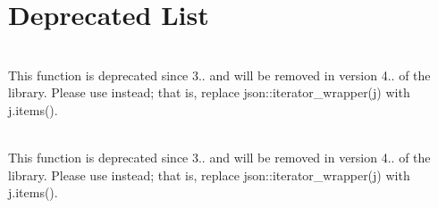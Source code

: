 \chapter{Deprecated List }
\hypertarget{deprecated}{}\label{deprecated}

\begin{DoxyRefList}
\item[{\parbox[t]{\linewidth}{Member \doxylink{classbasic__json_ab8b4e0acdea49e5f0a77abdf1ce465d2}{basic\+\_\+json\texorpdfstring{$<$}{<} Object\+Type, Array\+Type, String\+Type, Boolean\+Type, Number\+Integer\+Type, Number\+Unsigned\+Type, Number\+Float\+Type, Allocator\+Type, JSONSerializer, Binary\+Type, Custom\+Base\+Class \texorpdfstring{$>$}{>}::\+iterator\+\_\+wrapper} (reference ref) noexcept}}]\hfill \\
\label{deprecated__deprecated000148}%
%
This function is deprecated since 3.. and will be removed in version 4.. of the library. Please use  instead; that is, replace {\ttfamily json::\+iterator\+\_\+wrapper(j)} with {\ttfamily j.\+items()}.  
\item[{\parbox[t]{\linewidth}{Member \doxylink{classbasic__json_a7c0314258e5347eade0c6851017bf5a5}{basic\+\_\+json\texorpdfstring{$<$}{<} Object\+Type, Array\+Type, String\+Type, Boolean\+Type, Number\+Integer\+Type, Number\+Unsigned\+Type, Number\+Float\+Type, Allocator\+Type, JSONSerializer, Binary\+Type, Custom\+Base\+Class \texorpdfstring{$>$}{>}::\+iterator\+\_\+wrapper} (\doxylink{classbasic__json_a31370bb451b78198d42c86dd31955deb}{const\+\_\+reference} ref) noexcept}}]\hfill \\
\label{deprecated__deprecated000149}%
%
This function is deprecated since 3.. and will be removed in version 4.. of the library. Please use  instead; that is, replace {\ttfamily json::\+iterator\+\_\+wrapper(j)} with {\ttfamily j.\+items()}.  
\item[{\parbox[t]{\linewidth}{Member \doxylink{classbasic__json_af9907af448f7ff794120033e132025f6}{basic\+\_\+json\texorpdfstring{$<$}{<} Object\+Type, Array\+Type, String\+Type, Boolean\+Type, Number\+Integer\+Type, Number\+Unsigned\+Type, Number\+Float\+Type, Allocator\+Type, JSONSerializer, Binary\+Type, Custom\+Base\+Class \texorpdfstring{$>$}{>}::\+operator\texorpdfstring{$<$}{<}\texorpdfstring{$<$}{<}} (\doxylink{classbasic__json}{basic\+\_\+json} \&j, std::\+istream \&i)}}]\hfill \\

\end{DoxyRefList}

